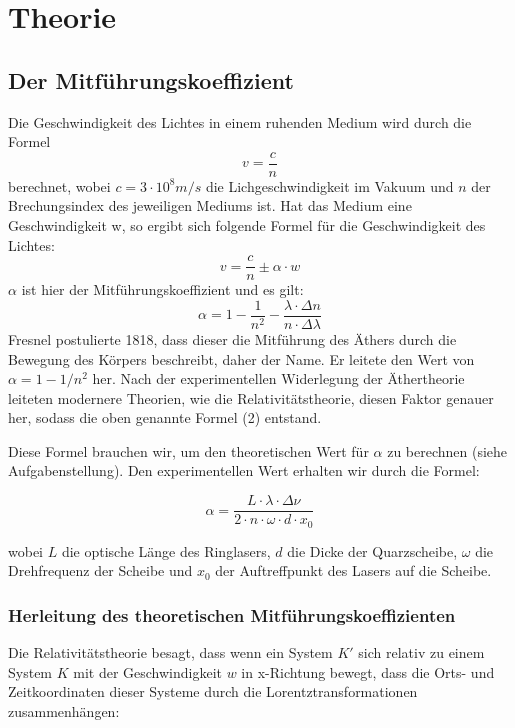 \section{Theorie}

\subsection{Der Mitführungskoeffizient}

Die Geschwindigkeit des Lichtes in einem ruhenden Medium wird durch die Formel $$v=\frac{c}{n}$$ berechnet, wobei $c = 3\cdot 10^8 m/s$ die Lichgeschwindigkeit im Vakuum und $n$ der Brechungsindex des jeweiligen Mediums ist. Hat das Medium eine Geschwindigkeit w, so ergibt sich folgende Formel für die Geschwindigkeit des Lichtes:
\begin{equation} v = \frac{c}{n} \pm \alpha\cdot w  \end{equation}
$\alpha$ ist hier der Mitführungskoeffizient und es gilt:
\begin{equation} \alpha = 1 - \frac{1}{n^2} - \frac{\lambda\cdot\Delta n}{n \cdot\Delta\lambda} \end{equation}
Fresnel postulierte 1818, dass dieser die Mitführung des Äthers durch die Bewegung des Körpers beschreibt, daher der Name. Er leitete den Wert von $\alpha = 1 - 1/n^2$ her. Nach der experimentellen Widerlegung der Äthertheorie leiteten modernere Theorien, wie die Relativitätstheorie, diesen Faktor genauer her, sodass die oben genannte Formel (2) entstand.


Diese Formel brauchen wir, um den theoretischen Wert für $\alpha$ zu berechnen (siehe Aufgabenstellung). Den experimentellen Wert erhalten wir durch die Formel:

\begin{equation} \alpha = \frac{L\cdot\lambda\cdot\Delta\nu}{2\cdot n\cdot\omega\cdot d \cdot x_0} \end{equation}

wobei $L$ die optische Länge des Ringlasers, $d$ die Dicke der Quarzscheibe, $\omega$ die Drehfrequenz der Scheibe und $x_0$ der Auftreffpunkt des Lasers auf die Scheibe.


\subsubsection{Herleitung des theoretischen Mitführungskoeffizienten}

Die Relativitätstheorie besagt, dass wenn ein System $K'$ sich relativ zu einem System $K$ mit der Geschwindigkeit $w$ in x-Richtung bewegt, dass die Orts- und Zeitkoordinaten dieser Systeme durch die Lorentztransformationen zusammenhängen: 

